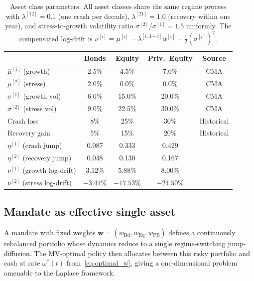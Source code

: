 \documentclass[11pt,a4paper]{article}
\numberwithin{equation}{section}
\begin{document}
\begin{table}[H]
\centering
\caption{Asset class parameters. All asset classes share the same regime process with $\lambda^{[12]} = 0.1$ (one crash per decade), $\lambda^{[21]} = 1.0$ (recovery within one year), and stress-to-growth volatility ratio $\sigma^{[2]}/\sigma^{[1]} = 1.5$ uniformly. The compensated log-drift is $\nu^{[i]} = \bar{\mu}^{[i]} - \lambda^{[i,3-i]} \alpha^{[i]} - \frac{1}{2}(\sigma^{[i]})^2$.}
\label{tab:params}
\small
\begin{tabular}{lcccc}
\toprule
& \textbf{Bonds} & \textbf{Equity} & \textbf{Priv.\ Equity} & \textbf{Source} \\
\midrule
$\bar{\mu}^{[1]}$ (growth) & 2.5\% & 4.5\% & 7.0\% & CMA \\
$\bar{\mu}^{[2]}$ (stress) & 2.0\% & 0.0\% & 0.0\% & CMA \\
$\sigma^{[1]}$ (growth vol) & 6.0\% & 15.0\% & 20.0\% & CMA \\
$\sigma^{[2]}$ (stress vol) & 9.0\% & 22.5\% & 30.0\% & CMA \\
Crash loss & 8\% & 25\% & 30\% & Historical \\
Recovery gain & 5\% & 15\% & 20\% & Historical \\
$\eta^{[1]}$ (crash jump) & 0.087 & 0.333 & 0.429 & \\
$\eta^{[2]}$ (recovery jump) & 0.048 & 0.130 & 0.167 & \\
\midrule
$\nu^{[1]}$ (growth log-drift) & 3.12\% & 5.88\% & 8.00\% & \\
$\nu^{[2]}$ (stress log-drift) & $-3.41\%$ & $-17.53\%$ & $-24.50\%$ & \\
\bottomrule
\end{tabular}
\end{table}




\subsection{Mandate as effective single asset}\label{sec:mandate_aggregation}

A mandate with fixed weights $\bm{w} = (w_{\mathrm{Bd}}, w_{\mathrm{Eq}}, 
w_{\mathrm{PE}})$ defines a continuously rebalanced portfolio whose dynamics 
reduce to a single regime-switching jump-diffusion. The MV-optimal policy 
then allocates between this risky portfolio and cash at 
rate $\omega^*(t)$ from~\eqref{eq:optimal_w}, giving a one-dimensional 
problem amenable to the Laplace framework.
\end{document}
